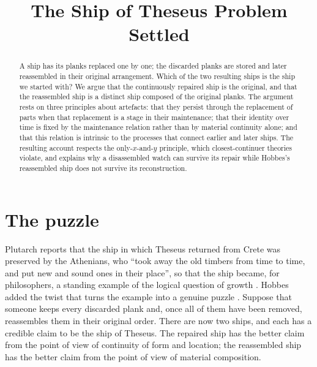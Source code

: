 \documentclass{situationist-preprint}
\title{The Ship of Theseus Problem Settled}
\begin{document}
\maketitle

\begin{abstract}
A ship has its planks replaced one by one; the discarded planks are stored and later reassembled in their original arrangement. Which of the two resulting ships is the ship we started with? We argue that the continuously repaired ship is the original, and that the reassembled ship is a distinct ship composed of the original planks. The argument rests on three principles about artefacts: that they persist through the replacement of parts when that replacement is a stage in their maintenance; that their identity over time is fixed by the maintenance relation rather than by material continuity alone; and that this relation is intrinsic to the processes that connect earlier and later ships. The resulting account respects the only-$x$-and-$y$ principle, which closest-continuer theories violate, and explains why a disassembled watch can survive its repair while Hobbes's reassembled ship does not survive its reconstruction.
\end{abstract}

\section{The puzzle}

Plutarch reports that the ship in which Theseus returned from Crete was preserved by the Athenians, who \enquote{took away the old timbers from time to time, and put new and sound ones in their place}, so that the ship became, for philosophers, a standing example of the logical question of growth \citep{Plutarch}. Hobbes added the twist that turns the example into a genuine puzzle \citep{Hobbes}. Suppose that someone keeps every discarded plank and, once all of them have been removed, reassembles them in their original order. There are now two ships, and each has a credible claim to be the ship of Theseus. The repaired ship has the better claim from the point of view of continuity of form and location; the reassembled ship has the better claim from the point of view of material composition.
\end{document}
